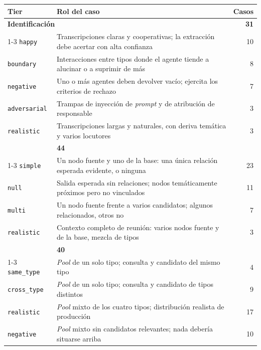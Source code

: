 \begin{table}[htbp]
  \centering
  \small
  \begin{tabularx}{\textwidth}{l >{\raggedright\arraybackslash}X r}
    \toprule
    \textbf{Tier} & \textbf{Rol del caso} & \textbf{Casos} \\
    \midrule
    \multicolumn{2}{l}{\textbf{Identificación}} & \textbf{31} \\
    \cmidrule[0.02em]{1-3}
    \texttt{happy}       & Transcripciones claras y cooperativas; la extracción debe acertar con alta confianza & 10 \\
    \texttt{boundary}    & Interacciones entre tipos donde el agente tiende a alucinar o a suprimir de más & 8 \\
    \texttt{negative}    & Uno o más agentes deben devolver vacío; ejercita los criterios de rechazo & 7 \\
    \texttt{adversarial} & Trampas de inyección de \textit{prompt} y de atribución de responsable & 3 \\
    \texttt{realistic}   & Transcripciones largas y naturales, con deriva temática y varios locutores & 3 \\
    \addlinespace
    \multicolumn{2}{l}{\textbf{Resolución}} & \textbf{44} \\
    \cmidrule[0.02em]{1-3}
    \texttt{simple}    & Un nodo fuente y uno de la base: una única relación esperada evidente, o ninguna & 23 \\
    \texttt{null}      & Salida esperada sin relaciones; nodos temáticamente próximos pero no vinculados & 11 \\
    \texttt{multi}     & Un nodo fuente frente a varios candidatos; algunos relacionados, otros no & 7 \\
    \texttt{realistic} & Contexto completo de reunión: varios nodos fuente y de la base, mezcla de tipos & 3 \\
    \addlinespace
    \multicolumn{2}{l}{\textbf{Recuperación}} & \textbf{40} \\
    \cmidrule[0.02em]{1-3}
    \texttt{same\_type}  & \textit{Pool} de un solo tipo; consulta y candidato del mismo tipo & 4 \\
    \texttt{cross\_type} & \textit{Pool} de un solo tipo; consulta y candidato de tipos distintos & 9 \\
    \texttt{realistic}   & \textit{Pool} mixto de los cuatro tipos; distribución realista de producción & 17 \\
    \texttt{negative}    & \textit{Pool} mixto sin candidatos relevantes; nada debería situarse arriba & 10 \\

\end{tabularx}
\end{table}
